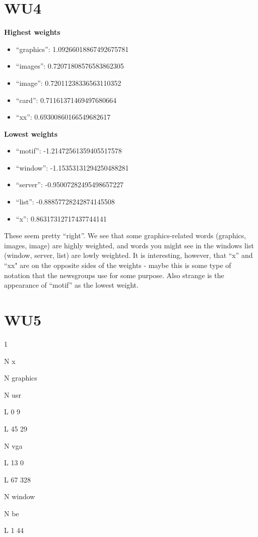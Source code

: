 \section{WU4}
    \textbf{Highest weights}
    \begin{itemize}
        \item ``graphics'': 1.09266018867492675781
        \item ``images'': 0.72071808576583862305
        \item ``image'': 0.72011238336563110352
        \item ``card'': 0.71161371469497680664
        \item ``xx'': 0.69300860166549682617
    \end{itemize}

    \textbf{Lowest weights}
    \begin{itemize}
        \item ``motif'': -1.21472561359405517578
        \item ``window'': -1.15353131294250488281
        \item ``server'': -0.95007282495498657227
        \item ``list'': -0.88857728242874145508
        \item ``x'': 0.86317312717437744141
    \end{itemize}

    These seem pretty ``right''. We see that some graphics-related words (graphics, images, image) are highly weighted, and words you might see in the windows list (window, server, list) are lowly weighted. It is interesting, however, that ``x'' and ``xx" are on the opposite sides of the weights - maybe this is some type of notation that the newsgroups use for some purpose. Also strange is the appearance of ``motif'' as the lowest weight.
\section{WU5}
1

N x

N graphics

N usr

L 0 9

L 45 29

N vga

L 13 0

L 67 328

N window

N be

L 1 44

